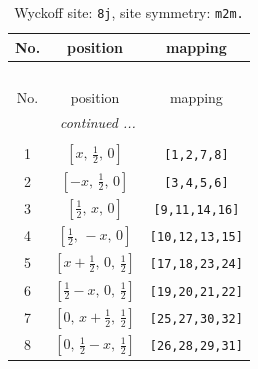 \documentclass[fleqn,8pt]{jsarticle}
\begin{document}
\begin{longtable}{ccc}
\caption{Wyckoff site: {\tt 8j}, site symmetry: {\tt m2m.}}
 \\
 \hline \hline
No. & position & mapping \\ \hline \endfirsthead

\multicolumn{2}{l}{\tablename\ \thetable{}} \\
 \hline \hline
No. & position & mapping \\ \hline \endhead

 \hline \hline
\multicolumn{2}{r}{\footnotesize\it continued ...} \\ \endfoot

 \hline \hline
\multicolumn{2}{r}{} \\ \endlastfoot

1 & $\left[ x,\, \frac{1}{2},\, 0 \right]$ & {\tt [1,2,7,8]} \\ \hline
2 & $\left[ - x,\, \frac{1}{2},\, 0 \right]$ & {\tt [3,4,5,6]} \\ \hline
3 & $\left[ \frac{1}{2},\, x,\, 0 \right]$ & {\tt [9,11,14,16]} \\ \hline
4 & $\left[ \frac{1}{2},\, - x,\, 0 \right]$ & {\tt [10,12,13,15]} \\ \hline
5 & $\left[ x + \frac{1}{2},\, 0,\, \frac{1}{2} \right]$ & {\tt [17,18,23,24]} \\ \hline
6 & $\left[ \frac{1}{2} - x,\, 0,\, \frac{1}{2} \right]$ & {\tt [19,20,21,22]} \\ \hline
7 & $\left[ 0,\, x + \frac{1}{2},\, \frac{1}{2} \right]$ & {\tt [25,27,30,32]} \\ \hline
8 & $\left[ 0,\, \frac{1}{2} - x,\, \frac{1}{2} \right]$ & {\tt [26,28,29,31]} \\
\end{longtable}
\renewcommand{\arraystretch}{1.2}
\end{document}
